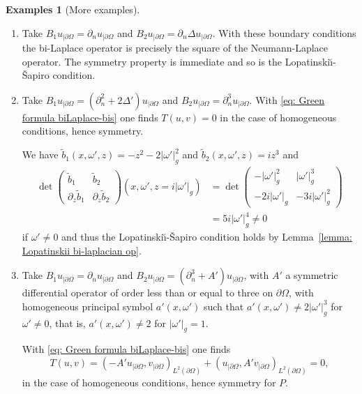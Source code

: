 \documentclass[10pt]{amsart}
\theoremstyle{plain}
\theoremstyle{definition}
\newtheorem{examples}[theorem]{Examples}
\newcommand{\LS}{Lopatinski\u{\i}-\v{S}apiro\xspace}
\newcommand{\inp}[2]{(#1, #2)}
\newcommand{\bd}{\ensuremath{_{|\partial\Omega}}}
\begin{document}
\skpt
\begin{examples}[More examples]
\begin{enumerate}

\item Take $B_1 u\bd =\partial_n u\bd$ and $B_2 u\bd
= \partial_n \Delta u\bd$. With these boundary conditions the bi-Laplace operator is precisely
the square of the Neumann-Laplace operator. The symmetry property is
immediate and so is the \LS condition.

\item Take $B_1 u\bd = (\partial_n^2 + 2 \Delta') u\bd$ and $B_2 u\bd
= \partial_n^3 u\bd$. With \eqref{eq: Green formula biLaplace-bis} one finds
$T(u,v) =0$ in the case of homogeneous conditions, hence symmetry.

We have $\tilde{b}_1(x,\omega',z)=-z^2 - 2 |\omega'|_g^2$ and
$\tilde{b}_2(x,\omega',z)=iz^3$ and
\begin{align*}
\det
\begin{pmatrix}
\tilde{b}_1 &\tilde{b}_2 \\[
2pt]
\partial_z\tilde{b}_1& \partial_z\tilde{b}_2
\end{pmatrix} (x,\omega',z=i|\omega'|_g)
&=
\det
\begin{pmatrix}
-|\omega'|_g^2 &|\omega'|^3_g \\[
2pt]
-2 i |\omega'|_g&-3i|\omega'|^2_g
\end{pmatrix} \\
&=5 i |\omega'|^4_g \neq 0
\end{align*}
if $\omega'\neq 0$ and thus the \LS condition holds by Lemma~\ref{lemma: Lopatinskii bi-laplacian op}.

\item Take $B_1 u\bd = \partial_n u\bd$ and $B_2 u\bd
= (\partial_n^3+ A') u\bd$, with $A'$ a symmetric differential
operator of order less than or equal to three on
$\partial \Omega$, with homogeneous principal symbol $a'(x,\omega')$ such that
$a'(x,\omega') \neq 2 |\omega'|_g ^3$ for $\omega' \neq 0$, that
is, $a'(x,\omega')\neq 2$ for $|\omega'|_g=1$.

With \eqref{eq: Green formula biLaplace-bis} one
finds
\begin{equation*}
T(u,v) = \inp{-A' u\bd}{v\bd}_{L^2(\partial\Omega)}
+ \inp{u\bd}{A' v\bd}_{L^2(\partial\Omega)} =0,
\end{equation*}
in the case of homogeneous conditions, hence symmetry for $P$.


\end{enumerate}
\end{examples}
\end{document}
